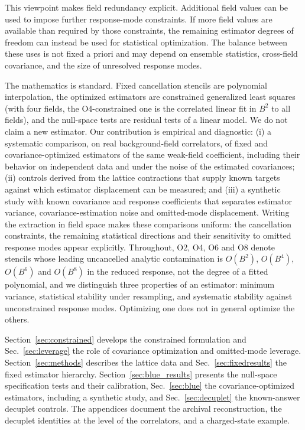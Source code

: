 \documentclass[aps,prd,reprint,twocolumn,superscriptaddress,nofootinbib,longbibliography]{revtex4-2}
\begin{document}
This viewpoint makes field redundancy explicit. Additional field values can be used to impose further response-mode constraints. If more field values are available than required by those constraints, the remaining estimator degrees of freedom can instead be used for statistical optimization. The balance between these uses is not fixed a priori and may depend on ensemble statistics, cross-field covariance, and the size of unresolved response modes.

The mathematics is standard. Fixed cancellation stencils are polynomial interpolation, the optimized estimators are constrained generalized least squares (with four fields, the O4-constrained one is the correlated linear fit in $B^2$ to all fields), and the null-space tests are residual tests of a linear model. We do not claim a new estimator. Our contribution is empirical and diagnostic: (i) a systematic comparison, on real background-field correlators, of fixed and covariance-optimized estimators of the same weak-field coefficient, including their behavior on independent data and under the noise of the estimated covariances; (ii) controls derived from the lattice contractions that supply known targets against which estimator displacement can be measured; and (iii) a synthetic study with known covariance and response coefficients that separates estimator variance, covariance-estimation noise and omitted-mode displacement. Writing the extraction in field space makes these comparisons uniform: the cancellation constraints, the remaining statistical directions and their sensitivity to omitted response modes appear explicitly. Throughout, O2, O4, O6 and O8 denote stencils whose leading uncancelled analytic contamination is $O(B^2)$, $O(B^4)$, $O(B^6)$ and $O(B^8)$ in the reduced response, not the degree of a fitted polynomial, and we distinguish three properties of an estimator: minimum variance, statistical stability under resampling, and systematic stability against unconstrained response modes. Optimizing one does not in general optimize the others.

Section~\ref{sec:constrained} develops the constrained formulation and Sec.~\ref{sec:leverage} the role of covariance optimization and omitted-mode leverage. Section~\ref{sec:methods} describes the lattice data and Sec.~\ref{sec:fixedresults} the fixed estimator hierarchy. Section~\ref{sec:blue_results} presents the null-space specification tests and their calibration, Sec.~\ref{sec:blue} the covariance-optimized estimators, including a synthetic study, and Sec.~\ref{sec:decuplet} the known-answer decuplet controls. The appendices document the archival reconstruction, the decuplet identities at the level of the correlators, and a charged-state example.
\end{document}
